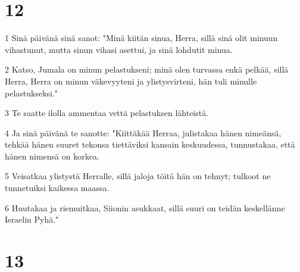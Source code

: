 \chapter{12}

\par 1 Sinä päivänä sinä sanot: "Minä kiitän sinua, Herra, sillä sinä olit minuun vihastunut, mutta sinun vihasi asettui, ja sinä lohdutit minua.
\par 2 Katso, Jumala on minun pelastukseni; minä olen turvassa enkä pelkää, sillä Herra, Herra on minun väkevyyteni ja ylistysvirteni, hän tuli minulle pelastukseksi."
\par 3 Te saatte ilolla ammentaa vettä pelastuksen lähteistä.
\par 4 Ja sinä päivänä te sanotte: "Kiittäkää Herraa, julistakaa hänen nimeänsä, tehkää hänen suuret tekonsa tiettäviksi kansain keskuudessa, tunnustakaa, että hänen nimensä on korkea.
\par 5 Veisatkaa ylistystä Herralle, sillä jaloja töitä hän on tehnyt; tulkoot ne tunnetuiksi kaikessa maassa.
\par 6 Huutakaa ja riemuitkaa, Siionin asukkaat, sillä suuri on teidän keskellänne Israelin Pyhä."

\chapter{13}

